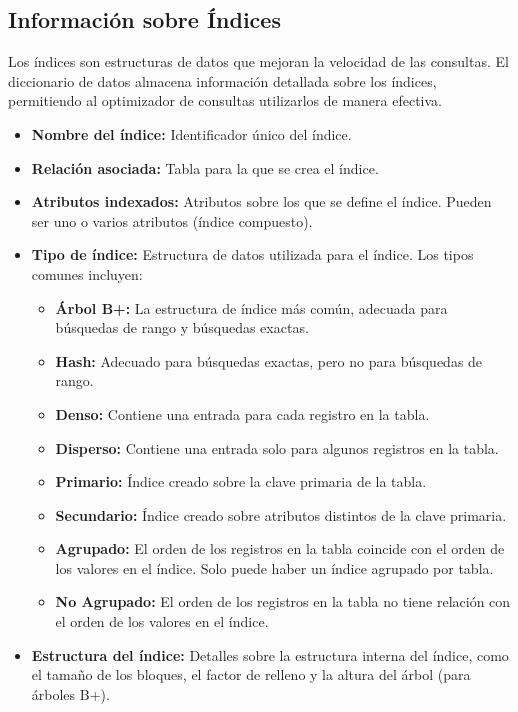 \subsection{Información sobre Índices}

Los índices son estructuras de datos que mejoran la velocidad de las consultas. El diccionario de datos almacena información detallada sobre los índices, permitiendo al optimizador de consultas utilizarlos de manera efectiva.

\begin{itemize}
    \item \textbf{Nombre del índice:}  Identificador único del índice.
    \item \textbf{Relación asociada:}  Tabla para la que se crea el índice.
    \item \textbf{Atributos indexados:}  Atributos sobre los que se define el índice.  Pueden ser uno o varios atributos (índice compuesto).
    \item \textbf{Tipo de índice:}  Estructura de datos utilizada para el índice.  Los tipos comunes incluyen:
    \begin{itemize}
        \item \textbf{Árbol B+:}  La estructura de índice más común, adecuada para búsquedas de rango y búsquedas exactas.
        \item \textbf{Hash:}  Adecuado para búsquedas exactas, pero no para búsquedas de rango.
        \item \textbf{Denso:}  Contiene una entrada para cada registro en la tabla.
        \item \textbf{Disperso:}  Contiene una entrada solo para algunos registros en la tabla.
        \item \textbf{Primario:}  Índice creado sobre la clave primaria de la tabla.
        \item \textbf{Secundario:}  Índice creado sobre atributos distintos de la clave primaria.
        \item \textbf{Agrupado:}  El orden de los registros en la tabla coincide con el orden de los valores en el índice.  Solo puede haber un índice agrupado por tabla.
        \item \textbf{No Agrupado:} El orden de los registros en la tabla no tiene relación con el orden de los valores en el índice.
    \end{itemize}
    \item \textbf{Estructura del índice:}  Detalles sobre la estructura interna del índice, como el tamaño de los bloques, el factor de relleno y la altura del árbol (para árboles B+).
\end{itemize}

